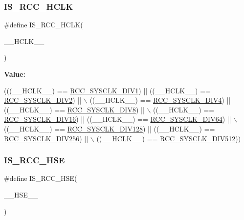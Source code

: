 \subsubsection{\texorpdfstring{I\+S\+\_\+\+R\+C\+C\+\_\+\+H\+C\+LK}{IS\_RCC\_HCLK}}
{\footnotesize\ttfamily \#define I\+S\+\_\+\+R\+C\+C\+\_\+\+H\+C\+LK(\begin{DoxyParamCaption}\item[{}]{\+\_\+\+\_\+\+H\+C\+L\+K\+\_\+\+\_\+ }\end{DoxyParamCaption})}

{\bfseries Value\+:}
\begin{DoxyCode}
(((\_\_HCLK\_\_) == \hyperlink{group___r_c_c___a_h_b___clock___source_ga226f5bf675015ea677868132b6b83494}{RCC\_SYSCLK\_DIV1}) || ((\_\_HCLK\_\_) == 
      \hyperlink{group___r_c_c___a_h_b___clock___source_gac37c0610458a92e3cb32ec81014625c3}{RCC\_SYSCLK\_DIV2}) || \(\backslash\)
                               ((\_\_HCLK\_\_) == \hyperlink{group___r_c_c___a_h_b___clock___source_ga6fd3652d6853563cdf388a4386b9d22f}{RCC\_SYSCLK\_DIV4}) || ((\_\_HCLK\_\_) == 
      \hyperlink{group___r_c_c___a_h_b___clock___source_ga7def31373854ba9c72bb76b1d13e3aad}{RCC\_SYSCLK\_DIV8}) || \(\backslash\)
                               ((\_\_HCLK\_\_) == \hyperlink{group___r_c_c___a_h_b___clock___source_ga895462b261e03eade3d0139cc1327a51}{RCC\_SYSCLK\_DIV16}) || ((\_\_HCLK\_\_) == 
      \hyperlink{group___r_c_c___a_h_b___clock___source_ga73814b5a7ee000687ec8334637ca5b14}{RCC\_SYSCLK\_DIV64}) || \(\backslash\)
                               ((\_\_HCLK\_\_) == \hyperlink{group___r_c_c___a_h_b___clock___source_ga43eddf4d4160df30548a714dce102ad8}{RCC\_SYSCLK\_DIV128}) || ((\_\_HCLK\_\_) == 
      \hyperlink{group___r_c_c___a_h_b___clock___source_ga94956d6e9c3a78230bf660b838f987e2}{RCC\_SYSCLK\_DIV256}) || \(\backslash\)
                               ((\_\_HCLK\_\_) == \hyperlink{group___r_c_c___a_h_b___clock___source_gabe18a9d55c0858bbfe3db657fb64c76d}{RCC\_SYSCLK\_DIV512}))
\end{DoxyCode}
\mbox{\label{group___r_c_c___private___macros_ga3c9bb7f31e4cd8436a41ae33c8908226}} 
\subsubsection{\texorpdfstring{I\+S\+\_\+\+R\+C\+C\+\_\+\+H\+SE}{IS\_RCC\_HSE}}
{\footnotesize\ttfamily \#define I\+S\+\_\+\+R\+C\+C\+\_\+\+H\+SE(\begin{DoxyParamCaption}\item[{}]{\+\_\+\+\_\+\+H\+S\+E\+\_\+\+\_\+ }\end{DoxyParamCaption})}

